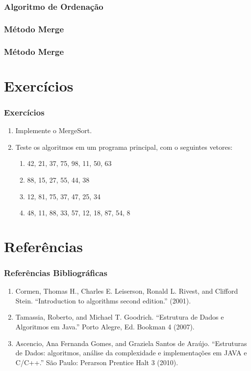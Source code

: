 \documentclass{beamer}
\begin{document}
\begin{frame}
	\frametitle{Algoritmo de Ordenação}
    \centering
    
\end{frame}

\begin{frame}
	\frametitle{Método Merge}
    \centering
    
\end{frame}

\begin{frame}
	\frametitle{Método Merge}
    \centering
    
\end{frame}

\section{Exercícios}

\begin{frame}
    \frametitle{Exercícios}

    \begin{enumerate}
        \item Implemente o MergeSort.
        \item Teste os algoritmos em um programa principal, com o seguintes vetores:
        \begin{enumerate}
            \item 42, 21, 37, 75, 98, 11, 50, 63
            \item 88, 15, 27, 55, 44, 38
            \item 12, 81, 75, 37, 47, 25, 34
            \item 48, 11, 88, 33, 57, 12, 18, 87, 54, 8
        \end{enumerate}
    \end{enumerate}
\end{frame}

\section{Referências}

\begin{frame}
    \frametitle{Referências Bibliográficas}
    \begin{enumerate}
        \item Cormen, Thomas H., Charles E. Leiserson, Ronald L. Rivest, and Clifford Stein. ``Introduction to algorithms second edition.'' (2001).
        \item Tamassia, Roberto, and Michael T. Goodrich. ``Estrutura de Dados e Algoritmos em Java.'' Porto Alegre, Ed. Bookman 4 (2007).
        \item Ascencio, Ana Fernanda Gomes, and Graziela Santos de Araújo. ``Estruturas de Dados: algoritmos, análise da complexidade e implementações em JAVA e C/C++.'' São Paulo: Perarson Prentice Halt 3 (2010).
    \end{enumerate}
\end{frame}
\end{document}
